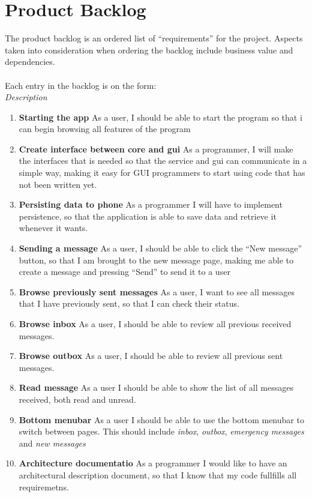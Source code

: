 \chapter{Product Backlog}
The product backlog is an ordered list of ``requirements'' for the project. Aspects taken into consideration when ordering the backlog include business value and dependencies.\\\\
		Each entry in the backlog is on the form:\\
			 {\it Description}
		
		\begin{enumerate}
			\item {\bf Starting the app} As a user, I should be able to start the program so that i can begin browsing all features of the program
			\item {\bf Create interface between core and gui} As a programmer, I will make the interfaces that is needed so that the service and gui can communicate in a simple way, making it easy for GUI programmers to start using code that has not been written yet.
			\item {\bf Persisting data to phone} As a programmer I will have to implement persistence, so that the application is able to save data and retrieve it whenever it wants.
			\item {\bf Sending a message} As a user, I should be able to click the ``New message'' button, so that I am brought to the new message page, making me able to create a message and pressing ``Send'' to send it to a user
			\item {\bf Browse previously sent messages} As a user, I want to see all messages that I have previously sent, so that I can check their status.
			\item {\bf Browse inbox} As a user, I should be able to review all previous received messages.
			\item {\bf Browse outbox} As a user, I should be able to review all previous sent messages.
			\item {\bf{Read message}} As a user I should be able to show the list of all messages received, both read and unread.
			\item {\bf Bottom menubar} As a user I should be able to use the bottom menubar to switch between pages. This should include {\it inbox}, {\it outbox}, {\it emergency messages} and {\it new messages}
			\item {\bf Architecture documentatio} As a programmer I would like to have an architectural description document, so that I know that my code fullfills all requiremetns.

\end{enumerate}
